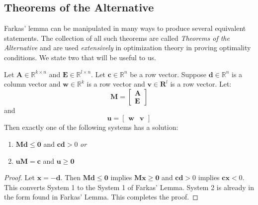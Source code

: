 \subsection{Theorems of the Alternative}
Farkas' lemma can be manipulated in many ways to produce several equivalent statements. The collection of all such theorems are called \textit{Theorems of the Alternative} and are used \textit{extensively} in optimization theory in proving optimality conditions. We state two that will be useful to us.

\begin{corollary} Let $\mathbf{A} \in \mathbb{R}^{k \times n}$ and $\mathbf{E} \in \mathbb{R}^{l \times n}$.  Let $\mathbf{c} \in \mathbb{R}^n$ be a row vector. Suppose $\mathbf{d} \in \mathbb{R}^n$ is a column vector and $\mathbf{w} \in \mathbb{R}^k$ is a row vector and $\mathbf{v} \in \mathbf{R}^{l}$ is a row vector.  Let:
\begin{displaymath}
\mathbf{M} = \begin{bmatrix}
\mathbf{A}\\
\mathbf{E}
\end{bmatrix}
\end{displaymath}
and
\begin{displaymath}
\mathbf{u} = \begin{bmatrix}
\mathbf{w} & \mathbf{v}
\end{bmatrix}
\end{displaymath}
Then exactly one of the following systems has a solution:
\begin{enumerate}
\item $\mathbf{M}\mathbf{d} \leq \mathbf{0}$ and $\mathbf{c}\mathbf{d} > 0$ \textit{or}
\item $\mathbf{u}\mathbf{M} = \mathbf{c}$ and $\mathbf{u}\geq \mathbf{0}$
\end{enumerate}
\label{cor:KKT}
\end{corollary}
\begin{proof} Let $\mathbf{x} = -\mathbf{d}$. Then $\mathbf{M}\mathbf{d} \leq \mathbf{0}$ implies $\mathbf{M}\mathbf{x} \geq \mathbf{0}$ and $\mathbf{c}\mathbf{d} > 0$ implies $\mathbf{c}\mathbf{x} < 0$. This converts System 1 to the System 1 of Farkas' Lemma. System 2 is already in the form found in Farkas' Lemma. This completes the proof. 
\end{proof}

